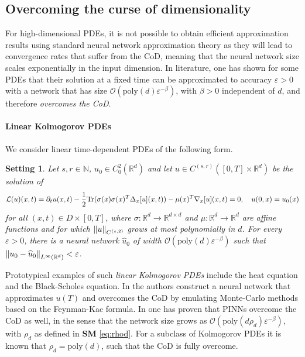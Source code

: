 \documentclass{article}
\numberwithin{equation}{section}
\newcommand{\poly}{\mathrm{poly}}
\newcommand{\R}{\mathbb{R}}
\newcommand{\N}{\mathbb{N}}
\newcommand{\cL}{\mathcal{L}}
\newcommand{\uhat}{{\widehat{u}}}
\renewcommand{\epsilon}{\varepsilon}
\newcommand{\1}{\mathbbm{1}}
\newcommand{\bigO}{\mathcal{O}}
\newtheorem{setting}[theorem]{Setting}%
\begin{document}
\subsection{Overcoming the curse of dimensionality}\label{sec:CoD}

For high-dimensional PDEs, it is not possible to obtain efficient approximation results using standard neural network approximation theory \cite{yarotsky2017error, deryck2021approximation} as they will lead to convergence rates that suffer from the CoD, meaning that the neural network size scales exponentially in the input dimension. In literature, one has shown for some PDEs that their solution at a fixed time can be approximated to accuracy $\epsilon>0$ with a network that has size $\bigO(\poly(d)\epsilon^{-\beta})$, with $\beta>0$ independent of $d$, and therefore \emph{overcomes the CoD}. 

\paragraph{Linear Kolmogorov PDEs}
We consider linear time-dependent PDEs of the following form. 

\begin{setting}\label{set:kolmogorov}
Let $s,r\in\N$, $u_0\in C^2_0(\R^d)$ and let $u\in C^{(s,r)}([0,T]\times \R^d)$ be the solution of
\begin{equation}\label{eq:kolmogorov-pde}
    {\color{black}\cL (u)(x,t) = \partial_t u(x,t) - \frac{1}{2}\mathrm{Tr}(\sigma(x)\sigma(x)^T \Delta_x[u](x,t)) - \mu(x)^T \nabla_x[u](x,t) = 0, \quad u(0,x)=u_0(x)}
\end{equation}
for all $(x,t)\in D \times [0,T]$, where $\sigma:\mathbb{R}^d\to \mathbb{R}^{d\times d}$ and $\mu:\mathbb{R}^d\to \mathbb{R}^d$ are affine functions and for which $\norm{u}_{C^{(s,2)}}$ grows at most polynomially in $d$. For every $\epsilon>0$, there is a neural network $\uhat_0$ of width $\bigO(\poly(d)\epsilon^{-\beta})$ such that $\norm{u_0-\uhat_0}_{L^\infty(\R^d)}<\epsilon$. 
\end{setting}


Prototypical examples of such \emph{linear Kolmogorov PDEs} include the heat equation and the Black-Scholes equation. In \cite{grohs2018proof, berner2020analysis, jentzen2018proof} the authors construct a neural network that approximates $u(T)$ and overcomes the CoD by emulating Monte-Carlo methods based on the Feynman-Kac formula. In \cite{deryck2021pinn} one has proven that PINNs overcome the CoD as well, in the sense that the network size grows as $\bigO(\poly(d\rho_d)\epsilon^{-\beta})$, with $\rho_d$ as defined in {\bf SM} \eqref{eq:rhod}. For a subclass of Kolmogorov PDEs it is known that $\rho_d=\poly(d)$, such that the CoD is fully overcome. 
\end{document}
